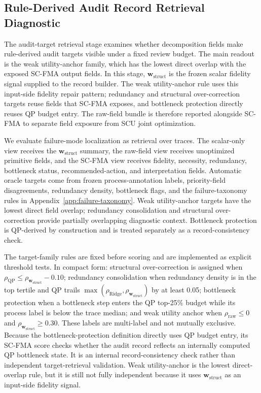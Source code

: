 \documentclass[a4paper,fleqn]{cas-sc}
\newcommand{\wstruct}{\ensuremath{\mathbf{w}_{\mathrm{struct}}}}
\begin{document}
\subsection{Rule-Derived Audit Record Retrieval Diagnostic}
\label{sec:why-calibration}
\label{sec:audit-results}
\label{sec:oracle-auto-validation}

The audit-target retrieval stage examines whether decomposition fields make rule-derived audit targets visible under a fixed review budget. The main readout is the weak utility-anchor family, which has the lowest direct overlap with the exposed SC-FMA output fields. In this stage, \wstruct{} is the frozen scalar fidelity signal supplied to the record builder. The weak utility-anchor rule uses this input-side fidelity repair pattern; redundancy and structural over-correction targets reuse fields that SC-FMA exposes, and bottleneck protection directly reuses QP budget entry. The raw-field bundle is therefore reported alongside SC-FMA to separate field exposure from SCU joint optimization.

We evaluate failure-mode localization as retrieval over traces. The scalar-only view receives the \wstruct{} summary, the raw-field view receives unoptimized primitive fields, and the SC-FMA view receives fidelity, necessity, redundancy, bottleneck status, recommended-action, and interpretation fields. Automatic oracle targets come from frozen process-annotation labels, priority-field disagreements, redundancy density, bottleneck flags, and the failure-taxonomy rules in Appendix~\ref{app:failure-taxonomy}. Weak utility-anchor targets have the lowest direct field overlap; redundancy consolidation and structural over-correction provide partially overlapping diagnostic context. Bottleneck protection is QP-derived by construction and is treated separately as a record-consistency check.

The target-family rules are fixed before scoring and are implemented as explicit threshold tests. In compact form: structural over-correction is assigned when $\rho_{\mathrm{QP}}\le \rho_{\wstruct{}} - 0.10$; redundancy consolidation when redundancy density is in the top tertile and QP trails $\max(\rho_{\mathrm{Ridge}},\rho_{\wstruct{}})$ by at least 0.05; bottleneck protection when a bottleneck step enters the QP top-25\% budget while its process label is below the trace median; and weak utility anchor when $\rho_{\mathrm{raw}}\le 0$ and $\rho_{\wstruct{}}\ge 0.30$. These labels are multi-label and not mutually exclusive. Because the bottleneck-protection definition directly uses QP budget entry, its SC-FMA score checks whether the audit record reflects an internally computed QP bottleneck state. It is an internal record-consistency check rather than independent target-retrieval validation. Weak utility-anchor is the lowest direct-overlap rule, but it is still not fully independent because it uses \wstruct{} as an input-side fidelity signal.
\end{document}
